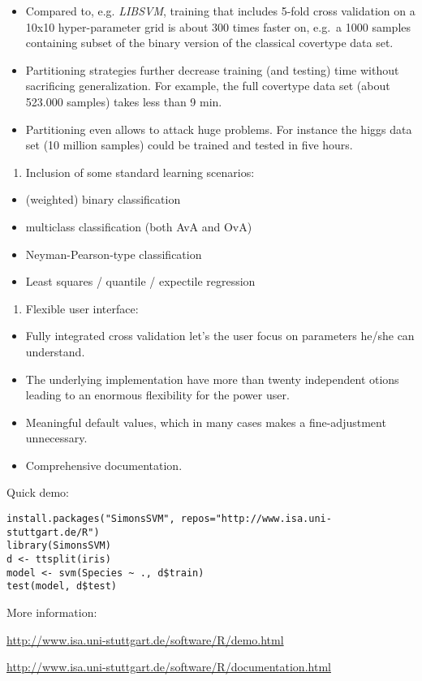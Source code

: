 \documentclass[\main/boa.tex]{subfiles}
\begin{document}
\begin{itemize}
\tightlist
\item
  Compared to, e.g. \emph{LIBSVM}, training that includes 5-fold cross
  validation on a 10x10 hyper-parameter grid is about 300 times faster
  on, e.g.~a 1000 samples containing subset of the binary version of the
  classical covertype data set.
\item
  Partitioning strategies further decrease training (and testing) time
  without sacrificing generalization. For example, the full covertype
  data set (about 523.000 samples) takes less than 9 min.
\item
  Partitioning even allows to attack huge problems. For instance the
  higgs data set (10 million samples) could be trained and tested in
  five hours.
\end{itemize}

\begin{enumerate}
\def\labelenumi{\arabic{enumi}.}
\setcounter{enumi}{1}
\tightlist
\item
  Inclusion of some standard learning scenarios:
\end{enumerate}

\begin{itemize}
\tightlist
\item
  (weighted) binary classification
\item
  multiclass classification (both AvA and OvA)
\item
  Neyman-Pearson-type classification
\item
  Least squares / quantile / expectile regression
\end{itemize}

\begin{enumerate}
\def\labelenumi{\arabic{enumi}.}
\setcounter{enumi}{2}
\tightlist
\item
  Flexible user interface:
\end{enumerate}

\begin{itemize}
\tightlist
\item
  Fully integrated cross validation let's the user focus on parameters
  he/she can understand.
\item
  The underlying implementation have more than twenty independent otions
  leading to an enormous flexibility for the power user.
\item
  Meaningful default values, which in many cases makes a fine-adjustment
  unnecessary.
\item
  Comprehensive documentation.
\end{itemize}

Quick demo:

\begin{verbatim}
install.packages("SimonsSVM", repos="http://www.isa.uni-stuttgart.de/R")
library(SimonsSVM)
d <- ttsplit(iris)
model <- svm(Species ~ ., d$train)
test(model, d$test)
\end{verbatim}

More information:

\url{http://www.isa.uni-stuttgart.de/software/R/demo.html}

\url{http://www.isa.uni-stuttgart.de/software/R/documentation.html}
\end{document}
